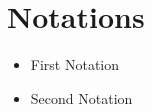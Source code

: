 \chapter*{Notations}

\begin{itemize}
    \item First Notation
    \item Second Notation 
\end{itemize}
